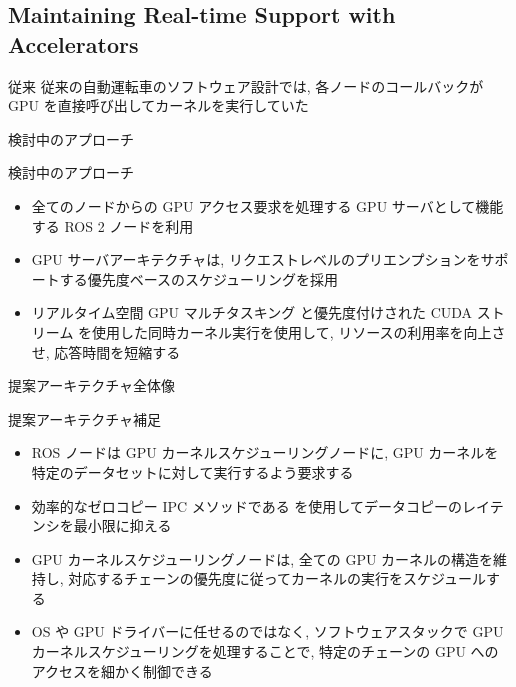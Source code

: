 \subsection{Maintaining Real-time Support with Accelerators}
\label{ssec: maintaining real-time support with accelerators}

\begin{frame}{従来}
    従来の自動運転車のソフトウェア設計では, 各ノードのコールバックが GPU を直接呼び出してカーネルを実行していた
\end{frame}

\begin{frame}{検討中のアプローチ}
    \begin{block}{検討中のアプローチ}
        \setlength{\linewidth}{0.98\columnwidth}
        \begin{itemize}
            \item 全てのノードからの GPU アクセス要求を処理する GPU サーバとして機能する ROS 2 ノードを利用
            \item GPU サーバアーキテクチャは, リクエストレベルのプリエンプションをサポートする優先度ベースのスケジューリングを採用
            \item リアルタイム空間 GPU マルチタスキング \cite{saha2019stgm, wang2021balancing} と優先度付けされた CUDA ストリーム \cite{xiang2019pipelined} を使用した同時カーネル実行を使用して, リソースの利用率を向上させ, 応答時間を短縮する
        \end{itemize}
    \end{block}
\end{frame}

\begin{frame}{提案アーキテクチャ全体像}
\end{frame}

\begin{frame}{提案アーキテクチャ補足}
    \begin{itemize}
        \item ROS ノードは GPU カーネルスケジューリングノードに, GPU カーネルを特定のデータセットに対して実行するよう要求する
        \item 効率的なゼロコピー IPC メソッドである  を使用してデータコピーのレイテンシを最小限に抑える
        \item GPU カーネルスケジューリングノードは, 全ての GPU カーネルの構造を維持し, 対応するチェーンの優先度に従ってカーネルの実行をスケジュールする
        \item OS や GPU ドライバーに任せるのではなく, ソフトウェアスタックで GPU カーネルスケジューリングを処理することで, 特定のチェーンの GPU へのアクセスを細かく制御できる
    \end{itemize}
\end{frame}
